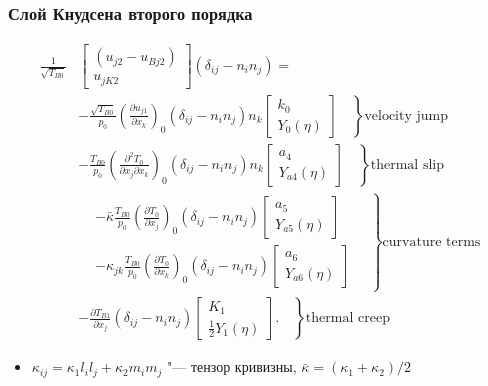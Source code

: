 \documentclass[mathserif]{beamer} %
\newcommand{\pder}[2][]{\frac{\partial#1}{\partial#2}}
\newcommand{\pderder}[3][]{\frac{\partial^2#1}{\partial#2\partial#3}}
\newcommand{\onwall}[1]{\left(#1\right)_0}
\newcommand{\deltann}[2]{(\delta_{#1#2}-n_#1 n_#2)}
\begin{document}
\begin{frame}
    \frametitle{Слой Кнудсена второго порядка}
    \footnotesize
    \begin{equation*}
        \begin{aligned}
            \frac1{\sqrt{T_{B0}}}&
                \begin{bmatrix} (u_{j2} - u_{Bj2}) \\ u_{jK2} \end{bmatrix}\deltann{i}{j} = \\
            &- \left.\frac{\sqrt{T_{B0}}}{p_0}\onwall{\pder[u_{j1}]{x_k}} \deltann{i}{j}n_k
                \begin{bmatrix} k_0 \\ Y_0(\eta) \end{bmatrix} \quad\right\}\text{velocity jump}\\
            &- \left.\frac{T_{B0}}{p_0}\onwall{\pderder[T_0]{x_j}{x_k}} \deltann{i}{j}n_k
                \begin{bmatrix} a_4 \\ Y_{a4}(\eta) \end{bmatrix} \quad\right\}\text{thermal slip} \\
            &\left.\begin{aligned}
                &- \bar\kappa\frac{T_{B0}}{p_0}\onwall{\pder[T_0]{x_j}} \deltann{i}{j}
                \begin{bmatrix} a_5 \\ Y_{a5}(\eta) \end{bmatrix} \\
                &- \kappa_{jk}\frac{T_{B0}}{p_0}\onwall{\pder[T_0]{x_k}} \deltann{i}{j}
                \begin{bmatrix} a_6 \\ Y_{a6}(\eta) \end{bmatrix}
            \end{aligned} \quad\right\}\text{curvature terms}\\
            &- \left.\pder[T_{B1}]{x_j} \deltann{i}{j}
                \begin{bmatrix} K_1 \\ \frac12 Y_1(\eta) \end{bmatrix}. \quad\right\}\text{thermal creep}
        \end{aligned}\label{eq:boundary_u2t}
    \end{equation*}
    \vspace{-10pt}
    \begin{itemize}
        \item \(\kappa_{ij} = \kappa_1 l_i l_j + \kappa_2 m_i m_j\) "--- тензор кривизны, \(\bar\kappa = (\kappa_1+\kappa_2)/2\)
    \end{itemize}
\end{frame}
\end{document}
